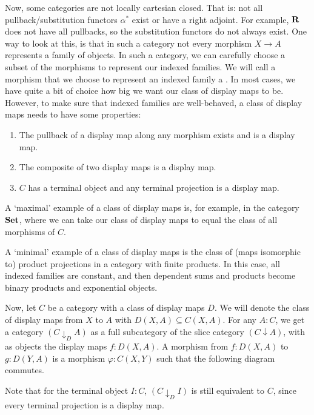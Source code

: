 Now, some categories are not locally cartesian closed. That is: not all pullback/substitution functors $ \alpha^* $ exist or have a right adjoint. For example, $ \mathbf{R} $ does not have all pullbacks, so the substitution functors do not always exist. One way to look at this, is that in such a category not every morphism $ X \to A $ represents a family of objects. In such a category, we can carefully choose a subset of the morphisms to represent our indexed families. We will call a morphism that we choose to represent an indexed family a . In most cases, we have quite a bit of choice how big we want our class of display maps to be. However, to make sure that indexed families are well-behaved, a class of display maps needs to have some properties:
\begin{enumerate}
  \item The pullback of a display map along any morphism exists and is a display map.
  \item The composite of two display maps is a display map.
  \item $ C $ has a terminal object and any terminal projection is a display map.
\end{enumerate}
\begin{remark}
  A `maximal' example of a class of display maps is, for example, in the category $ \mathbf{Set} $, where we can take our class of display maps to equal the class of all morphisms of $ C $.
\end{remark}
\begin{remark}
  A `minimal' example of a class of display maps is the class of (maps isomorphic to) product projections in a category with finite products. In this case, all indexed families are constant, and then dependent sums and products become binary products and exponential objects.
\end{remark}

Now, let $ C $ be a category with a class of display maps $ D $. We will denote the class of display maps from $ X $ to $ A $ with $ D(X, A) \subseteq C(X, A) $. For any $ A : C $, we get a category $ (C \downarrow_D A) $ as a full subcategory of the slice category $ (C \downarrow A) $, with as objects the display maps $ f: D(X, A) $. A morphism from $ f: D(X, A) $ to $ g: D(Y, A) $ is a morphism $ \varphi: C(X, Y) $ such that the following diagram commutes.
\begin{center}
\end{center}
Note that for the terminal object $ I : C $, $ (C \downarrow_D I) $ is still equivalent to $ C $, since every terminal projection is a display map.

